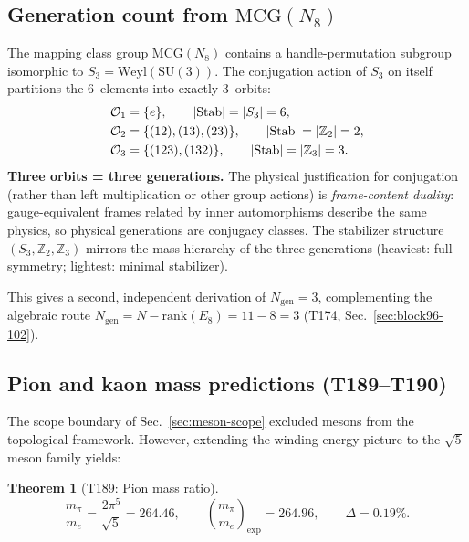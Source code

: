 \documentclass[aps,prd,twocolumn,superscriptaddress,floatfix,nofootinbib]{revtex4-2}
\newtheorem{theorem}{Theorem}
\theoremstyle{definition}
\theoremstyle{remark}
\begin{document}
\subsection{Generation count from $\mathrm{MCG}(N_8)$}
\label{sec:generation-count}

The mapping class group $\mathrm{MCG}(N_8)$ contains a handle-permutation
subgroup isomorphic to $S_3 = \mathrm{Weyl}(\mathrm{SU}(3))$.  The
conjugation action of $S_3$ on itself partitions the 6~elements into
exactly 3~orbits:
\begin{align}
\mathcal{O}_1 &= \{e\}, \qquad |\mathrm{Stab}| = |S_3| = 6, \notag\\
\mathcal{O}_2 &= \{(12),(13),(23)\}, \qquad |\mathrm{Stab}| = |\mathbb{Z}_2| = 2, \\
\mathcal{O}_3 &= \{(123),(132)\}, \qquad |\mathrm{Stab}| = |\mathbb{Z}_3| = 3. \notag
\end{align}
\textbf{Three orbits = three generations.}  The physical justification
for conjugation (rather than left multiplication or other group actions)
is \emph{frame-content duality}: gauge-equivalent frames related by
inner automorphisms describe the same physics, so physical generations
are conjugacy classes.  The stabilizer structure $(S_3, \mathbb{Z}_2,
\mathbb{Z}_3)$ mirrors the mass hierarchy of the three generations
(heaviest: full symmetry; lightest: minimal stabilizer).

\noindent
This gives a second, independent derivation of $N_{\mathrm{gen}} = 3$,
complementing the algebraic route $N_{\mathrm{gen}} = N - \mathrm{rank}(E_8) = 11 - 8 = 3$
(T174, Sec.~\ref{sec:block96-102}).

\subsection{Pion and kaon mass predictions (T189--T190)}
\label{sec:meson-mass}

The scope boundary of Sec.~\ref{sec:meson-scope} excluded mesons from the
topological framework.  However, extending the winding-energy picture to
the $\sqrt{5}$ meson family yields:

\begin{theorem}[T189: Pion mass ratio]
\begin{equation}
\frac{m_\pi}{m_e} = \frac{2\pi^5}{\sqrt{5}} = 264.46,
\qquad \left(\frac{m_\pi}{m_e}\right)_{\!\mathrm{exp}} = 264.96,
\qquad \Delta = 0.19\%.
\end{equation}
\end{theorem}
\end{document}
